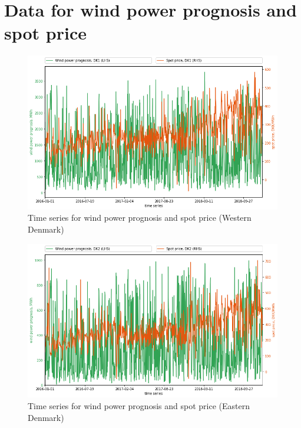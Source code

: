 \section{Data for wind power prognosis and spot price}
\label{app:data}

\begin{figure}[H]
  \centering
  \caption{Time series for wind power prognosis and spot price (Western Denmark)}
  \label{fig:wp_dk1_time_series}
    \includegraphics[width=1 \textwidth]{03_figures/wp_dk1_time series}
\end{figure}

\begin{figure}[H]
  \centering
  \caption{Time series for wind power prognosis and spot price (Eastern Denmark)}
  \label{fig:wp_dk2_time_series}
    \includegraphics[width=1 \textwidth]{03_figures/wp_dk2_time series}
\end{figure}

